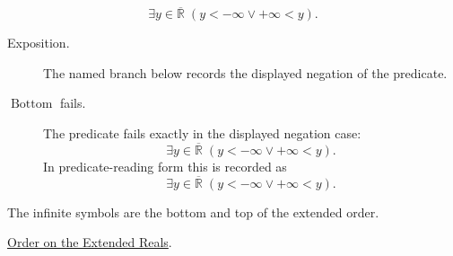 \begin{remark*}
\[
  \exists y\in\overline{\mathbb{R}}\;(y<-\infty\lor +\infty<y).
\]
\end{remark*}

\begin{remark*}
\begin{description}
  \item[Exposition.] The named branch below records the displayed negation of the predicate.
  \item[\(\operatorname{Bottom}\) fails.] The predicate fails exactly in the displayed negation case:
  \[
  \exists y\in\overline{\mathbb{R}}\;(y<-\infty\lor +\infty<y).
  \]
  In predicate-reading form this is recorded as
  \[
    \exists y\in\overline{\mathbb{R}}\;(y<-\infty\lor +\infty<y).
  \]
\end{description}
\end{remark*}
\begin{remark*}[Interpretation]
The infinite symbols are the bottom and top of the extended order.
\end{remark*}
\begin{dependencies}
\hyperref[def:extended-real-order]{Order on the Extended Reals}.
\end{dependencies}

